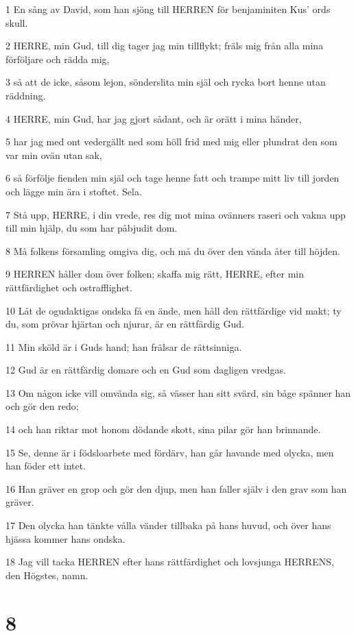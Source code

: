 \par 1 En sång av David, som han sjöng till HERREN för benjaminiten Kus' ords skull.
\par 2 HERRE, min Gud, till dig tager jag min tillflykt; fräls mig från alla mina förföljare och rädda mig,
\par 3 så att de icke, såsom lejon, sönderslita min själ och rycka bort henne utan räddning.
\par 4 HERRE, min Gud, har jag gjort sådant, och är orätt i mina händer,
\par 5 har jag med ont vedergällt ned som höll frid med mig eller plundrat den som var min ovän utan sak,
\par 6 så förfölje fienden min själ och tage henne fatt och trampe mitt liv till jorden och lägge min ära i stoftet. Sela.
\par 7 Stå upp, HERRE, i din vrede, res dig mot mina ovänners raseri och vakna upp till min hjälp, du som har påbjudit dom.
\par 8 Må folkens församling omgiva dig, och må du över den vända åter till höjden.
\par 9 HERREN håller dom över folken; skaffa mig rätt, HERRE, efter min rättfärdighet och ostrafflighet.
\par 10 Låt de ogudaktigas ondska få en ände, men håll den rättfärdige vid makt; ty du, som prövar hjärtan och njurar, är en rättfärdig Gud.
\par 11 Min sköld är i Guds hand; han frälsar de rättsinniga.
\par 12 Gud är en rättfärdig domare och en Gud som dagligen vredgas.
\par 13 Om någon icke vill omvända sig, så vässer han sitt svärd, sin båge spänner han och gör den redo;
\par 14 och han riktar mot honom dödande skott, sina pilar gör han brinnande.
\par 15 Se, denne är i födsloarbete med fördärv, han går havande med olycka, men han föder ett intet.
\par 16 Han gräver en grop och gör den djup, men han faller själv i den grav som han gräver.
\par 17 Den olycka han tänkte vålla vänder tillbaka på hans huvud, och över hans hjässa kommer hans ondska.
\par 18 Jag vill tacka HERREN efter hans rättfärdighet och lovsjunga HERRENS, den Högstes, namn.

\chapter{8}

